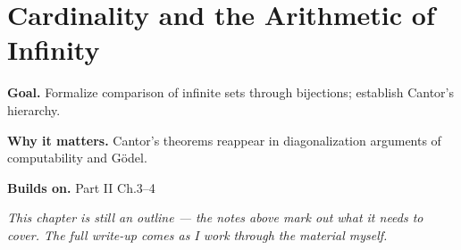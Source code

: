 \chapter{Cardinality and the Arithmetic of Infinity}
\label{ch:02-set-theory-05}

\begin{chapterintro}
\textbf{Goal.} Formalize comparison of infinite sets through bijections; establish Cantor's hierarchy.

\textbf{Why it matters.} Cantor's theorems reappear in diagonalization arguments of computability and Gödel.

\textbf{Builds on.} Part II Ch.3–4
\end{chapterintro}

\textit{This chapter is still an outline --- the notes above mark out what it needs to cover. The full write-up comes as I work through the material myself.}
